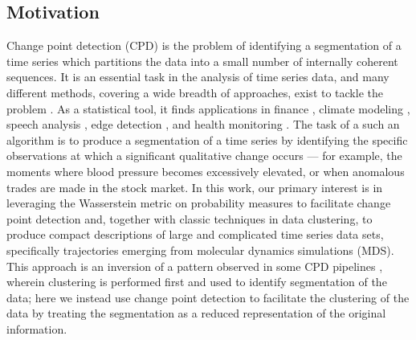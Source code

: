 \documentclass{article}
\begin{document}
\subsection{Motivation}
Change point detection (CPD) is the problem of identifying a segmentation of a time series which partitions the data into a small number of internally coherent sequences.  It is an essential task in the analysis of time series data, and many different methods, covering a wide breadth of approaches, exist to tackle the problem \cite{aminikhanghahiSurveyMethodsTime2017}. As a statistical tool, it finds applications in finance \cite{kimUnsupervisedChangePoint2022, habibiBayesianOnlineChange2021, pepelyshevRealtimeFinancialSurveillance2017}, climate modeling \cite{reevesReviewComparisonChangepoint2007, beaulieuChangepointAnalysisTool2012, gallagherChangepointDetectionClimate2013}, speech analysis \cite{tahmasbiChangePointDetection2008, cmejlaBayesianChangepointDetection2013, guptaSpeakerChangePoint2015}, edge detection \cite{tourneretBayesianOfflineDetection2003, huangLaplacianChangePoint2020, huangStatisticalTheoryEdge1988}, and health monitoring \cite{liuChangepointDetectionMethod2018, alhassanBridgingDataDiagnostics2025, wuUnsupervisedBayesianChangepoint2024}.  The task of a such an algorithm is to produce a segmentation of a time series by identifying the specific observations at which a significant qualitative change occurs --- for example, the moments where blood pressure becomes excessively elevated, or when anomalous trades are made in the stock market.  In this work, our primary interest is in leveraging the Wasserstein metric on probability measures to facilitate change point detection and, together with classic techniques in data clustering, to produce compact descriptions of large and complicated time series data sets, specifically trajectories emerging from molecular dynamics simulations (MDS).  This approach is an inversion of a pattern observed in some CPD pipelines \cite{adamsBayesianOnlineChangepoint2007, zhengLearningTransportationMode2008, reddyUsingMobilePhones2010}, wherein clustering is performed first and used to identify segmentation of the data; here we instead use change point detection to facilitate the clustering of the data by treating the segmentation as a reduced representation of the original information.
\end{document}
